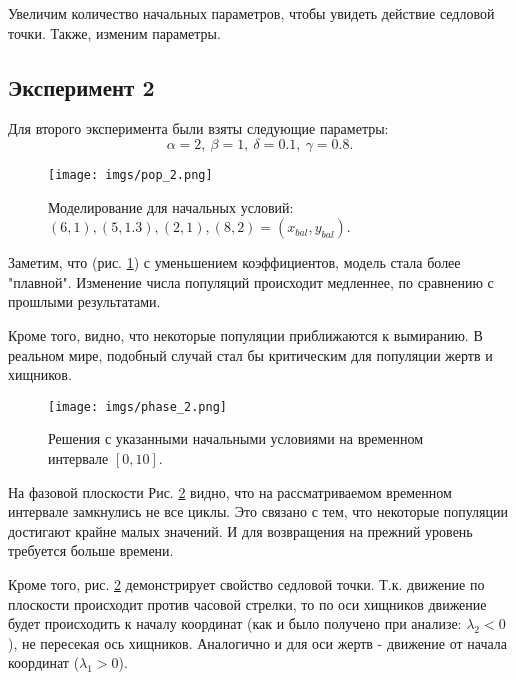 Увеличим количество начальных параметров, чтобы увидеть действие седловой точки. Также, изменим параметры.
\newpage
\subsection*{Эксперимент 2}
Для второго эксперимента были взяты следующие параметры: $$\alpha = 2, \ \beta = 1, \ \delta = 0.1, \ \gamma = 0.8.$$

\begin{figure}[h]  %
	\centering
	\texttt{[image: imgs/pop\_2.png]}  %
	\caption{Моделирование для начальных условий: $(6, 1), (5,1.3), (2,1), (8,2) = (x_{bal}, y_{bal})$.}  %
	\label{fig:pop_2}  %
\end{figure}

Заметим, что (рис. \ref{fig:pop_2}) с уменьшением коэффициентов, модель стала более "плавной". Изменение числа популяций происходит медленнее, по сравнению с прошлыми результатами. 

Кроме того, видно, что некоторые популяции приближаются к вымиранию. В реальном мире, подобный случай стал бы критическим для популяции жертв и хищников.

\begin{figure}[h]  %
	\centering
	\texttt{[image: imgs/phase\_2.png]}  %
	\caption{Решения с указанными начальными условиями на временном интервале $[0,10]$.}  %
	\label{fig:phase_2}  %
\end{figure}

На фазовой плоскости Рис. \ref{fig:phase_2} видно, что на рассматриваемом временном интервале замкнулись не все циклы. 
Это связано с тем, что некоторые популяции достигают крайне малых значений. И для возвращения на прежний уровень требуется больше времени.

Кроме того, рис. \ref{fig:phase_2} демонстрирует свойство седловой точки. Т.к. движение по плоскости происходит против часовой стрелки, то по оси хищников движение будет происходить к началу координат (как и было получено при анализе: $\lambda_2 < 0$), не пересекая ось хищников. Аналогично и для оси жертв - движение от начала координат ($\lambda_1 > 0$).